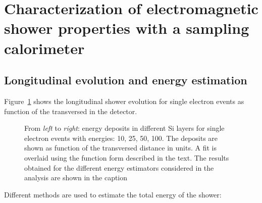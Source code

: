 %
%
%
\clearpage
\section{Characterization of electromagnetic shower properties with
a sampling calorimeter}
\label{sec:emshowerproperties}


\subsection{Longitudinal evolution and energy estimation}
\label{subsec:longevol}

Figure~\ref{fig:showerfits} shows the longitudinal shower evolution
for single electron events as function of the \Xnot transversed in the
detector.

\begin{figure}[h!]
  \begin{center}
    \caption{From {\em left} to {\em right}: energy deposits in different Si layers for single
      electron events with energies: 10, 25, 50, 100\GeV. The deposits
    are shown as function of the transversed distance in \Xnot
    units. A fit is overlaid using the function form described in the
    text. The results obtained for the different energy estimators considered in the analysis
    are shown in the caption}
    \label{fig:showerfits}
  \end{center}
\end{figure}


Different methods are used to estimate the total energy of the shower:

